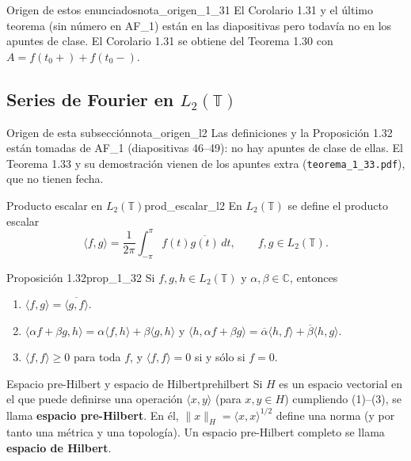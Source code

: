 \begin{nota}{Origen de estos enunciados}{nota_origen_1_31}
El Corolario 1.31 y el último teorema (sin número en AF\_1) están en las diapositivas pero todavía no en los apuntes de clase. El Corolario 1.31 se obtiene del Teorema 1.30 con $A = f(t_0+) + f(t_0-)$.
\end{nota}

\subsection{Series de Fourier en $L_2(\mathbb{T})$}

\begin{nota}{Origen de esta subsección}{nota_origen_l2}
Las definiciones y la Proposición 1.32 están tomadas de AF\_1 (diapositivas 46--49): no hay apuntes de clase de ellas. El Teorema 1.33 y su demostración vienen de los apuntes extra (\texttt{teorema\_1\_33.pdf}), que no tienen fecha.
\end{nota}

\begin{definicion}{Producto escalar en $L_2(\mathbb{T})$}{prod_escalar_l2}
En $L_2(\mathbb{T})$ se define el producto escalar
\[
\langle f, g\rangle = \frac{1}{2\pi}\int_{-\pi}^{\pi} f(t)\overline{g(t)}\,dt, \qquad f, g \in L_2(\mathbb{T}).
\]
\end{definicion}

\begin{proposicion}{Proposición 1.32}{prop_1_32}
Si $f, g, h \in L_2(\mathbb{T})$ y $\alpha, \beta \in \mathbb{C}$, entonces
\begin{enumerate}
\item[(1)] $\langle f, g\rangle = \overline{\langle g, f\rangle}$.
\item[(2)] $\langle \alpha f + \beta g, h\rangle = \alpha\langle f, h\rangle + \beta\langle g, h\rangle$ y $\langle h, \alpha f + \beta g\rangle = \overline{\alpha}\langle h, f\rangle + \overline{\beta}\langle h, g\rangle$.
\item[(3)] $\langle f, f\rangle \ge 0$ para toda $f$, y $\langle f, f\rangle = 0$ si y sólo si $f = 0$.
\end{enumerate}
\end{proposicion}

\begin{definicion}{Espacio pre-Hilbert y espacio de Hilbert}{prehilbert}
Si $H$ es un espacio vectorial en el que puede definirse una operación $\langle x, y\rangle$ (para $x, y \in H$) cumpliendo (1)--(3), se llama \textbf{espacio pre-Hilbert}. En él, $\|x\|_H = \langle x, x\rangle^{1/2}$ define una norma (y por tanto una métrica y una topología). Un espacio pre-Hilbert completo se llama \textbf{espacio de Hilbert}.
\end{definicion}

